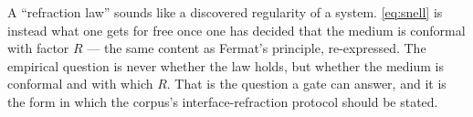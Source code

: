\begin{remark}
A ``refraction law'' sounds like a discovered regularity of a system. \eqref{eq:snell} is instead
what one gets for free once one has decided that the medium is conformal with factor $R$ --- the
same content as Fermat's principle, re-expressed. The empirical question is never whether the
law holds, but whether the medium is conformal and with which $R$. That is the question a gate can
answer, and it is the form in which the corpus's interface-refraction protocol should be stated.
\end{remark}
